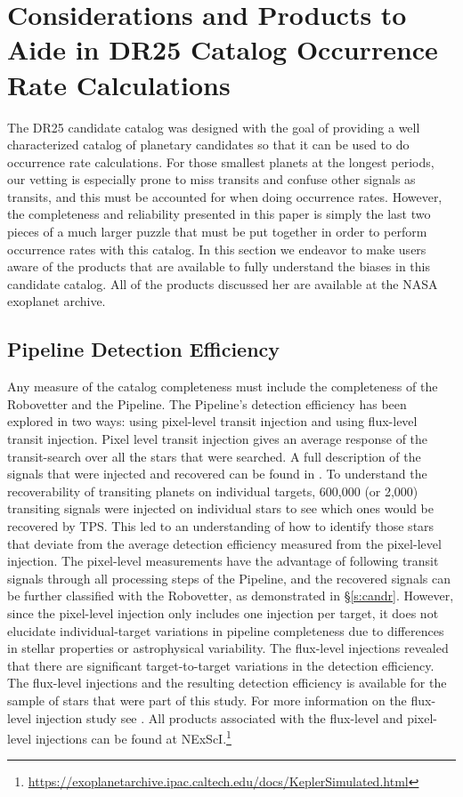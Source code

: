 \section{Considerations and Products to Aide in DR25 Catalog Occurrence Rate Calculations}
\label{s:occurates}
The DR25 candidate catalog was designed with the goal of providing a well characterized catalog of planetary candidates so that it can be used to do occurrence rate calculations.  For those smallest planets at the longest periods, our vetting is especially prone to miss transits and confuse other signals as transits, and this must be accounted for when doing occurrence rates.  However, the completeness and reliability presented in this paper is simply the last two pieces of a much larger puzzle that must be put together in order to perform occurrence rates with this catalog.  In this section we endeavor to make users aware of the products that are available to fully understand the biases in this candidate catalog.  All of the products discussed her are available at the NASA exoplanet archive. 

\subsection{Pipeline Detection Efficiency}
Any measure of the catalog completeness must include the completeness of the Robovetter and the \Kepler{} Pipeline.  The Pipeline's detection efficiency has been explored in two ways: using pixel-level transit injection and using flux-level transit injection.  Pixel level transit injection gives an average response of the transit-search over all the stars that were searched. A full description of the signals that were injected and recovered can be found in \citet{Christiansen2017}.  To understand the recoverability of transiting planets on individual targets, 600,000 (or 2,000) transiting signals were injected on individual stars to see which ones would be recovered by TPS.  This led to an understanding of how to identify those stars that deviate from the average detection efficiency measured from the pixel-level injection.  The pixel-level measurements have the advantage of following transit signals through all processing steps of the \Kepler{} Pipeline, and the recovered signals can be further classified with the Robovetter, as demonstrated in \S\ref{s:candr}.  However, since the pixel-level injection only includes one injection per target, it does not elucidate individual-target variations in pipeline completeness due to differences in stellar properties or astrophysical variability. The flux-level injections revealed  that  there  are  significant target-to-target variations in the detection efficiency. The flux-level injections and the resulting detection efficiency is available for the sample of stars that were part of this study. For more information on the flux-level injection study see \citet{Burke2017c}. All products associated with the flux-level and pixel-level injections can be found at NExScI.\footnote{\url{https://exoplanetarchive.ipac.caltech.edu/docs/KeplerSimulated.html}}


